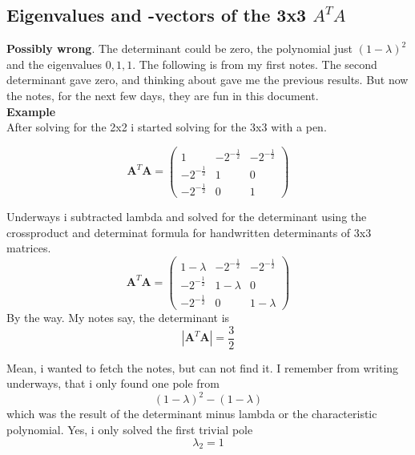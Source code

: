 \documentclass[a4paper]{article}
\begin{document}
\begin{PropositionOpt4}
\subsection{Eigenvalues and -vectors of the 3x3 $A^{T}A$}

\textbf{Possibly wrong}. The determinant could be zero, the polynomial just $(1-\lambda)^{2}$ and the eigenvalues $0,1,1$. The following is from my first notes. The second determinant gave zero, and thinking about gave me the previous results. But now the notes, for the next few days, they are fun in this document.\\

\textbf{Example}\\

After solving for the 2x2 i started solving for the 3x3 with a pen.

\begin{displaymath}
\boldsymbol{A}^{T}\boldsymbol{A} = \begin{pmatrix}1&-2^{-\frac12}&-2^{-\frac12}\\-2^{-\frac12}&1&0\\-2^{-\frac12}&0&1\end{pmatrix}
\end{displaymath}

Underways i subtracted lambda and solved for the determinant using the crossproduct and determinat formula for handwritten determinants of 3x3 matrices.\\

\begin{displaymath}
\boldsymbol{A}^{T}\boldsymbol{A} = \begin{pmatrix}1-\lambda&-2^{-\frac12}&-2^{-\frac12}\\-2^{-\frac12}&1-\lambda&0\\-2^{-\frac12}&0&1-\lambda\end{pmatrix}
\end{displaymath}
By the way. My notes say, the determinant is
\begin{displaymath}
|\boldsymbol{A}^{T}\boldsymbol{A}| = \frac32
\end{displaymath}

Mean, i wanted to fetch the notes, but can not find it. I remember from writing underways, that i only found one pole from
\begin{displaymath}
(1-\lambda)^{2}-(1-\lambda)
\end{displaymath}
which was the result of the determinant minus lambda or the characteristic polynomial. Yes, i only solved the first trivial pole
\begin{displaymath}
\lambda_{2}=1
\end{displaymath}


\end{PropositionOpt4}
\end{document}
